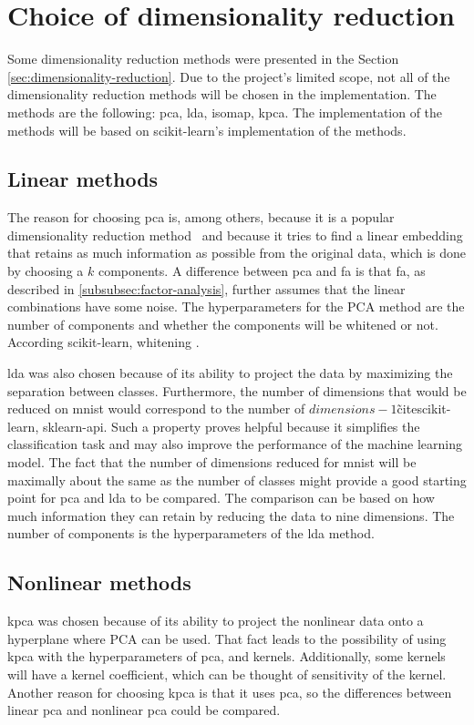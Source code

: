 \section{Choice of dimensionality reduction}\label{sec:choice-of-dimensionality-reduction}
Some dimensionality reduction methods were presented in the Section \ref{sec:dimensionality-reduction}. Due to the project's limited scope, not all of the dimensionality reduction methods will be chosen in the implementation. The methods are the following: \gls{pca}, \gls{lda}, \gls{isomap}, \gls{kpca}. The implementation of the methods will be based on scikit-learn's implementation of the methods.


\subsection{Linear methods}
The reason for choosing \gls{pca} is, among others, because it is a popular dimensionality reduction method~\cite{dimensionality-reduction-comparative-review} and because it tries to find a linear embedding that retains as much information as possible from the original data, which is done by choosing a $k$ components. A difference between \gls{pca} and \gls{fa} is that \gls{fa}, as described in \ref{subsubsec:factor-analysis}, further assumes that the linear combinations have some noise. The hyperparameters for the PCA method are the number of components and whether the components will be whitened or not. According scikit-learn, whitening .


\gls{lda} was also chosen because of its ability to project the data by maximizing the separation between classes. Furthermore, the number of dimensions that would be reduced on \gls{mnist} would correspond to the number of $dimensions-1$\~cite{scikit-learn, sklearn-api}. Such a property proves helpful because it simplifies the classification task and may also improve the performance of the machine learning model. The fact that the number of dimensions reduced for \gls{mnist} will be maximally about the same as the number of classes might provide a good starting point for \gls{pca} and \gls{lda} to be compared. The comparison can be based on how much information they can retain by reducing the data to nine dimensions. The number of components is the hyperparameters of the \gls{lda} method.


\subsection{Nonlinear methods}
\gls{kpca} was chosen because of its ability to project the nonlinear data onto a hyperplane where PCA can be used. That fact leads to the possibility of using \gls{kpca} with the hyperparameters of \gls{pca}, and kernels. Additionally, some kernels will have a kernel coefficient, which can be thought of sensitivity of the kernel. Another reason for choosing \gls{kpca} is that it uses \gls{pca}, so the differences between linear \gls{pca} and nonlinear \gls{pca} could be compared.

